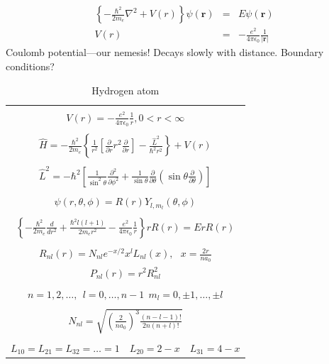 \documentclass[11pt]{article}
\begin{document}
\begin{eqnarray}
\left\{-\frac{\hbar^2}{2m_e}\nabla^2 + V(r)\right\} \psi(\bm{r}) &=& E \psi(\bm{r})\\
V(r) &=& -\frac{e^2}{4\pi\epsilon_0}\frac{1}{|\bm{r}|}
\end{eqnarray}
Coulomb potential---our nemesis!  Decays slowly with distance.  Boundary conditions?
\begin{table}[]
   \begin{center}
   \caption{Hydrogen atom}
    \label{Hydrogen atom}
\begin{tabular}[h]{|c|}
\hline
 \\
$\displaystyle       V(r) = -\frac{e^2}{4\pi\epsilon_0}\frac{1}{r}, 0 < r< \infty$ \\
 \\
$\displaystyle     \hat H = -\frac{\hbar^2}{2m_e}\left \{ \frac{1}{r^2}\left [
  \frac{\partial}{\partial r}r^2\frac{\partial}{\partial r}  \right ] - \frac{\hat{L}^2}{\hbar^2 r^2} \right \} +V(r)$ \\
\\
$\displaystyle     \hat L^2 = -\hbar^2 \left [
  \frac{1}{\sin^2\theta}\frac{\partial^2}{\partial \phi^2}+\frac{1}{\sin
    \theta}\frac{\partial}{\partial \theta}\left ( \sin \theta
    \frac{\partial}{\partial \theta}\right ) \right ] $ \\
\\
$\displaystyle \psi(r,\theta,\phi) = R(r)Y_{l,m_l}(\theta,\phi) $ \\
\\
$\displaystyle   \left \{ -\frac{\hbar^2}{2m_e}
            \frac{d}{dr^2}  + \frac{\hbar^2
              l(l+1)}{2 m_e r^2}
          -\frac{e^2}{4\pi\epsilon_0}\frac{1}{r}\right \} r R(r) = E r R(r) $ \\
\\
$\displaystyle R_{nl}(r) = N_{nl} e^{-x/2} x^l L_{nl}(x),\ \ \  x = \frac{2 r}{n a_0} $
\\
$\displaystyle P_{nl}(r) = r^2 R_{nl}^2 $
\\
\\
$\displaystyle n = 1, 2, \ldots,\ \  l = 0, \ldots, n-1 \ \ m_l = 0,\pm 1, \ldots, \pm l$
\\
\\
$\displaystyle N_{nl} = \sqrt{\left ( \frac{2}{na_0}\right )^3 \frac{(n-l-1)!}{2n(n+l)!}}$
\\
\\
$\displaystyle L_{10} = L_{21} = L_{32} = \ldots =1 \quad L_{20} = 2 - x \quad L_{31} = 4-x$
\\

\end{tabular}
\end{center}
\end{table}
\end{document}

